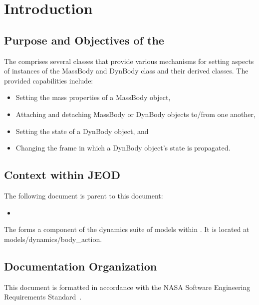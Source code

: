 %
\chapter{Introduction}
\label{ch:overview:intro}

\section{Purpose and Objectives of the \ModelDesc}
\label{sec:overview:purp}
The \ModelDesc comprises several classes that provide various mechanisms
for setting aspects of instances of the MassBody and DynBody class and
 their derived classes.
The provided capabilities include:
\begin{itemize}
\item Setting the mass properties of a MassBody object,
\item Attaching and detaching MassBody or DynBody objects to/from one another,
\item Setting the state of a DynBody object, and
\item Changing the frame in which a DynBody object's state is propagated.
\end{itemize}

\section{Context within JEOD}
The following document is parent to this document:
\begin{itemize}
\item \hyperJEOD
\end{itemize}

The \ModelDesc forms a component of the dynamics suite of
models within \JEODid. It is located at
models/dynamics/body\_action.





\section{Documentation Organization}
\label{sec:overview:docorg}
This document is formatted in accordance with the
NASA Software Engineering Requirements Standard~\cite{NASA:SWE}.

